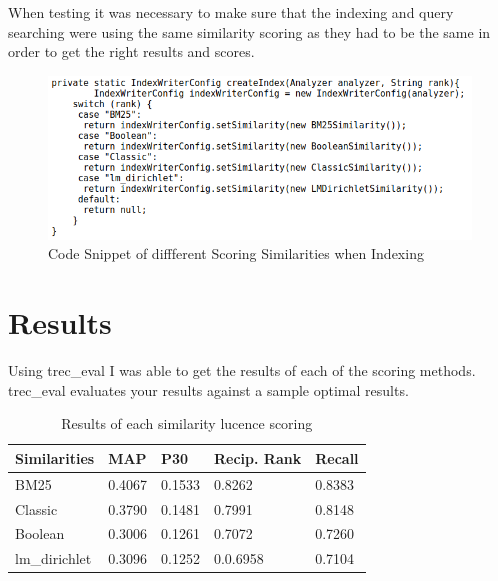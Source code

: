 When testing it was necessary to make sure that the indexing and query searching were using the same similarity scoring as they had to be the same in order to get the right results and scores. \par
 
	\begin{figure}[ht!]
		\begin{center}
			\includegraphics[scale=.35 ]{3} 
			\caption{Code Snippet of diffferent Scoring Similarities when Indexing}
			\label{fig:1}
		\end{center}
	\end{figure} \par



\section{Results}
Using trec\_eval I was able to get the results of each of the scoring methods. trec\_eval evaluates your results against a sample optimal results. \newline 


\begin{table}[H]
	\centering
	\begin{tabular}{|p{1.5cm}|p{1.25cm}|p{1.25cm}|p{1.25cm}|p{1.25cm}|}
	\hline Similarities & MAP & P30 & Recip. Rank & Recall \\ \hline
			BM25 					& 0.4067  & 0.1533 & 0.8262 & 0.8383 \\ \hline
			Classic 				& 0.3790  & 0.1481 & 0.7991 & 0.8148 \\ \hline
			Boolean 				& 0.3006  & 0.1261 & 0.7072 & 0.7260 \\ \hline
			lm\_dirichlet 			& 0.3096 & 0.1252 & 0.0.6958 & 0.7104 \\ \hline
	\end{tabular} 
	\caption{Results of each similarity lucence scoring}
	\label{table:results}
\end{table}
	
